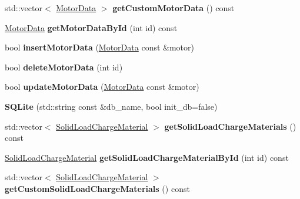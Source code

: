 \begin{DoxyCompactItemize}
\mbox{\label{class_s_q_lite_a40f0107a78cdb8d735242d954da87ac7}} 
std\+::vector$<$ \hyperlink{class_motor_data}{Motor\+Data} $>$ {\bfseries get\+Custom\+Motor\+Data} () const
\item 
\mbox{\label{class_s_q_lite_a4b0a99992e2909216b40dc499c86a028}} 
\hyperlink{class_motor_data}{Motor\+Data} {\bfseries get\+Motor\+Data\+By\+Id} (int id) const
\item 
\mbox{\label{class_s_q_lite_a38eb0f1501e0918c267a9ab3a0953a54}} 
bool {\bfseries insert\+Motor\+Data} (\hyperlink{class_motor_data}{Motor\+Data} const \&motor)
\item 
\mbox{\label{class_s_q_lite_ab1f59cd24e3931970bc39079b0a5e612}} 
bool {\bfseries delete\+Motor\+Data} (int id)
\item 
\mbox{\label{class_s_q_lite_a7909128eed1b0612ecdf7c50edf1426a}} 
bool {\bfseries update\+Motor\+Data} (\hyperlink{class_motor_data}{Motor\+Data} const \&motor)
\item 
\mbox{\label{class_s_q_lite_a758f334ed7e72820f4f0e83d2b707625}} 
{\bfseries S\+Q\+Lite} (std\+::string const \&db\+\_\+name, bool init\+\_\+db=false)
\item 
\mbox{\label{class_s_q_lite_af6195f55e9658c24a8f14b884e490acb}} 
std\+::vector$<$ \hyperlink{class_solid_load_charge_material}{Solid\+Load\+Charge\+Material} $>$ {\bfseries get\+Solid\+Load\+Charge\+Materials} () const
\item 
\mbox{\label{class_s_q_lite_ab2a00b913321a96a4d7b700627195616}} 
\hyperlink{class_solid_load_charge_material}{Solid\+Load\+Charge\+Material} {\bfseries get\+Solid\+Load\+Charge\+Material\+By\+Id} (int id) const
\item 
\mbox{\label{class_s_q_lite_a868c571d80d43a991762ec20c168ebb2}} 
std\+::vector$<$ \hyperlink{class_solid_load_charge_material}{Solid\+Load\+Charge\+Material} $>$ {\bfseries get\+Custom\+Solid\+Load\+Charge\+Materials} () const
\item 
\mbox{\label{class_s_q_lite_a5c40ac3b9a6abb85c9cfbe50802672c5}} 

\end{DoxyCompactItemize}
